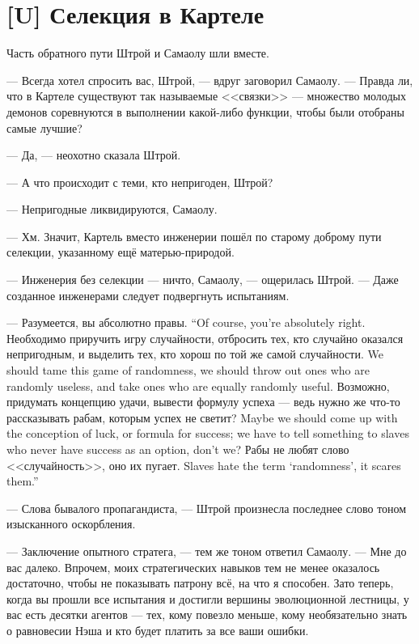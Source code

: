 \section{[U] Селекция в Картеле}

Часть обратного пути Штрой и Самаолу шли вместе.

--- Всегда хотел спросить вас, Штрой, --- вдруг заговорил Самаолу.
--- Правда ли, что в Картеле существуют так называемые <<связки>> --- множество молодых демонов соревнуются в выполнении какой-либо функции, чтобы были отобраны самые лучшие?

--- Да, --- неохотно сказала Штрой.

--- А что происходит с теми, кто непригоден, Штрой?

--- Непригодные ликвидируются, Самаолу.

--- Хм.
Значит, Картель вместо инженерии пошёл по старому доброму пути селекции, указанному ещё матерью-природой.

--- Инженерия без селекции --- ничто, Самаолу, --- ощерилась Штрой.
--- Даже созданное инженерами следует подвергнуть испытаниям.

{--- Разумеется, вы абсолютно правы.}
{``Of course, you're absolutely right.}
{Необходимо приручить игру случайности, отбросить тех, кто случайно оказался непригодным, и выделить тех, кто хорош по той же самой случайности.}
{We should tame this game of randomness, we should throw out ones who are randomly useless, and take ones who are equally randomly useful.}
{Возможно, придумать концепцию удачи, вывести формулу успеха --- ведь нужно же что-то рассказывать рабам, которым успех не светит?}
{Maybe we should come up with the conception of luck, or formula for success; we have to tell something to slaves who never have success as an option, don't we?}
{Рабы не любят слово <<случайность>>, оно их пугает.}
{Slaves hate the term `randomness', it scares them.''}

--- Слова бывалого пропагандиста, --- Штрой произнесла последнее слово тоном изысканного оскорбления.

--- Заключение опытного стратега, --- тем же тоном ответил Самаолу.
--- Мне до вас далеко.
Впрочем, моих стратегических навыков тем не менее оказалось достаточно, чтобы не показывать патрону всё, на что я способен.
Зато теперь, когда вы прошли все испытания и достигли вершины эволюционной лестницы, у вас есть десятки агентов --- тех, кому повезло меньше, кому необязательно знать о равновесии Нэша и кто будет платить за все ваши ошибки.

